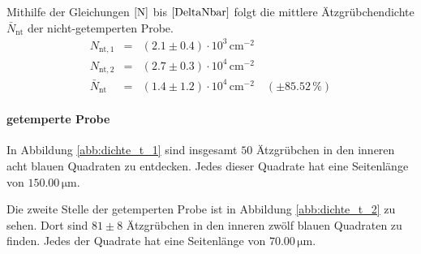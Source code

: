 \documentclass[12pt,a4paper]{scrartcl}
\numberwithin{equation}{section} %
\begin{document}
Mithilfe der Gleichungen $\eqref{N}$ bis $\eqref{DeltaNbar}$ folgt
die mittlere Ätzgrübchendichte $\bar N_\mathrm{nt}$ der
nicht-getemperten Probe.
\begin{eqnarray}
    N_\mathrm{nt,1} &=& (2.1 \pm 0.4) \cdot 10^3 \mathrm{\, cm^{-2}} \\
    N_\mathrm{nt,2} &=& (2.7 \pm 0.3) \cdot 10^{4} \mathrm{\, cm^{-2}} \\
    \bar N_\mathrm{nt}
        &=& (1.4 \pm 1.2) \cdot 10^4 \mathrm{\, cm^{-2}}
        \quad(\pm 85.52\,\%)
\end{eqnarray}

\hypertarget{getemperte-probe}{%
\paragraph*{getemperte Probe}\label{getemperte-probe}}

In Abbildung \ref{abb:dichte_t_1} sind insgesamt $50$ Ätzgrübchen in den inneren
acht blauen Quadraten zu entdecken. Jedes dieser Quadrate hat eine
Seitenlänge von $150.00 \mathrm{\, \mu m}$.

Die zweite Stelle der getemperten Probe ist in Abbildung \ref{abb:dichte_t_2} zu
sehen. Dort sind $81\pm8$ Ätzgrübchen in den inneren zwölf blauen
Quadraten zu finden. Jedes der Quadrate hat eine Seitenlänge von
$70.00 \mathrm{\, \mu m}$.
\end{document}
